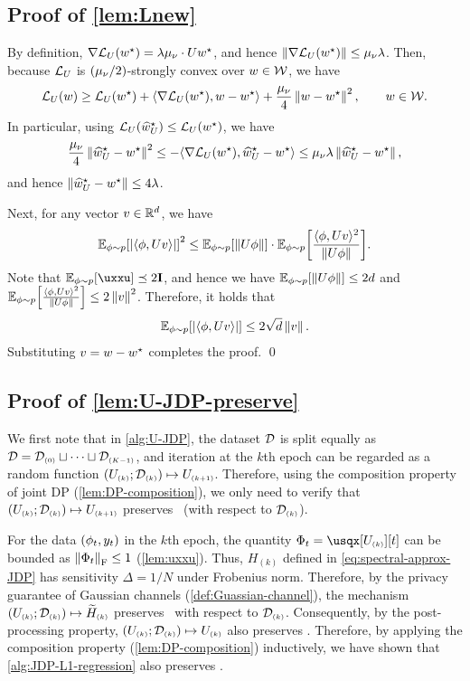 \subsection{Proof of \cref{lem:Lnew}}
By definition, $\nabla \mathcal{L}_{U}(w^\star)=\lambda \mu_\nu \cdot Uw^\star$, and hence $\left\|\nabla \mathcal{L}_{U}(w^\star)\right\|\leq \mu_\nu \lambda$. Then, because $\mathcal{L}_{U}$ is $(\mu_\nu/2)$-strongly convex over $w\in\mathcal{W}$, we have
\begin{align*}
    \mathcal{L}_{U}(w)\geq \mathcal{L}_{U}(w^\star)+\langle \nabla \mathcal{L}_{U}(w^\star), w-w^\star\rangle + \frac{\mu_\nu}{4}\left\|w-w^\star\right\|^2, \qquad w\in\mathcal{W}.
\end{align*}
In particular, using $\mathcal{L}_{U}(\widehat{w}^\star_U)\leq \mathcal{L}_{U}(w^\star)$, we have
\begin{align*}
    \frac{\mu_\nu}{4}\left\|\widehat{w}^\star_U-w^\star\right\|^2\leq -\langle \nabla \mathcal{L}_{U}(w^\star), \widehat{w}^\star_U-w^\star\rangle\leq \mu_\nu\lambda \left\|\widehat{w}^\star_U-w^\star\right\|,
\end{align*}
and hence $\left\|\widehat{w}^\star_U-w^\star\right\|\leq 4\lambda$.

Next, for any vector $v\in\mathbb{R}^d$, we have
\begin{align*}
    \mathbb{E}_{\phi\sim p}{\left[  \left|\langle \phi, Uv\rangle\right|  \right]}^2
    \leq \mathbb{E}_{\phi\sim p}{\left[  \left\|U\phi\right\|  \right]} \cdot \mathbb{E}_{\phi\sim p}{\left[ \frac{\langle \phi, Uv\rangle^2}{\left\|U\phi\right\|} \right]}.
\end{align*}
Note that $\Ex{\uxxu}\preceq 2\id$, and hence we have $\mathbb{E}_{\phi\sim p}{\left[  \left\|U\phi\right\|  \right]}\leq 2d$ and $\mathbb{E}_{\phi\sim p}{\left[ \frac{\langle \phi, Uv\rangle^2}{\left\|U\phi\right\|} \right]}\leq 2\left\|v\right\|^2$. Therefore, it holds that
\begin{align*}
    \mathbb{E}_{\phi\sim p}{\left[  \left|\langle \phi, Uv\rangle\right|  \right]}\leq 2\sqrt{d}\left\|v\right\|.
\end{align*}
Substituting $v=w-w^\star$ completes the proof.
\qed



\subsection{Proof of \cref{lem:U-JDP-preserve}}\label{appdx:JDP-verify}




We first note that in \cref{alg:U-JDP}, the dataset $\mathcal{D}$ is split equally as $\mathcal{D}=\mathcal{D}_{\scriptscriptstyle{ (0) }}\sqcup \cdots \sqcup \mathcal{D}_{\scriptscriptstyle{ (K-1) }}$, and iteration at the $k$th epoch can be regarded as a random function $(U_{\scriptscriptstyle{ (k) }};\mathcal{D}_{\scriptscriptstyle{ (k) }})\mapsto U_{\scriptscriptstyle{ (k+1) }}$. Therefore, using the composition property of joint DP (\cref{lem:DP-composition}), we only need to verify that $(U_{\scriptscriptstyle{ (k) }};\mathcal{D}_{\scriptscriptstyle{ (k) }})\mapsto U_{\scriptscriptstyle{ (k+1) }}$ preserves \aJDP~(with respect to $\mathcal{D}_{\scriptscriptstyle{ (k) }}$).

For the data $(\phi_t,y_t)$ in the $k$th epoch, the quantity $\Phi_t=\usqx[U\kk][t]$ can be bounded as $\left\|\Phi_t\right\|_{\mathrm{F}}\leq 1$ (\cref{lem:uxxu}). Thus, $H_{(k)}$ defined in \eqref{eq:spectral-approx-JDP} has sensitivity $\Delta=1/N$ under Frobenius norm. Therefore, by the privacy guarantee of Gaussian channels (\cref{def:Guassian-channel}), the mechanism $(U_{\scriptscriptstyle{ (k) }};\mathcal{D}_{\scriptscriptstyle{ (k) }})\mapsto \widetilde H_{\scriptscriptstyle{ (k) }}$ preserves \aJDP~with respect to $\mathcal{D}_{\scriptscriptstyle{ (k) }}$. Consequently, by the post-processing property, $(U_{\scriptscriptstyle{ (k) }};\mathcal{D}_{\scriptscriptstyle{ (k) }})\mapsto U_{\scriptscriptstyle{ (k) }}$ also preserves \aJDP. Therefore, by applying the composition property (\cref{lem:DP-composition}) inductively, we have shown that \cref{alg:JDP-L1-regression} also preserves \aJDP.




